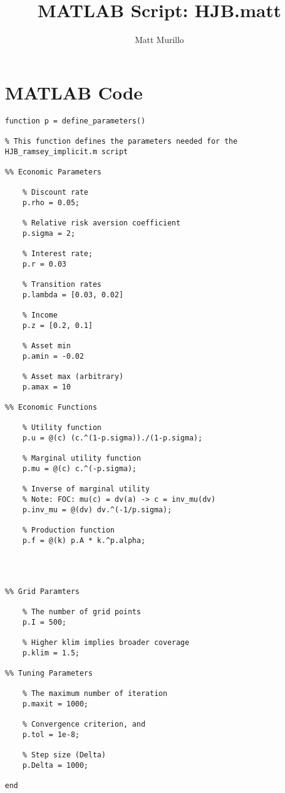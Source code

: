 






\title{MATLAB Script: HJB.matt}
\author{Matt Murillo}
\date{}

\maketitle

\section*{MATLAB Code}
\begin{lstlisting}
function p = define_parameters()

% This function defines the parameters needed for the HJB_ramsey_implicit.m script

%% Economic Parameters

    % Discount rate
    p.rho = 0.05;

    % Relative risk aversion coefficient
    p.sigma = 2;
    
    % Interest rate;
    p.r = 0.03

    % Transition rates
    p.lambda = [0.03, 0.02]

    % Income
    p.z = [0.2, 0.1]

    % Asset min
    p.amin = -0.02

    % Asset max (arbitrary)
    p.amax = 10

%% Economic Functions
    
    % Utility function
    p.u = @(c) (c.^(1-p.sigma))./(1-p.sigma);

    % Marginal utility function
    p.mu = @(c) c.^(-p.sigma);

    % Inverse of marginal utility
    % Note: FOC: mu(c) = dv(a) -> c = inv_mu(dv)
    p.inv_mu = @(dv) dv.^(-1/p.sigma);

    % Production function
    p.f = @(k) p.A * k.^p.alpha;

     
      

%% Grid Paramters

    % The number of grid points
    p.I = 500;

    % Higher klim implies broader coverage
    p.klim = 1.5;

%% Tuning Parameters
    
    % The maximum number of iteration
    p.maxit = 1000;

    % Convergence criterion, and
    p.tol = 1e-8;

    % Step size (Delta)
    p.Delta = 1000;

end
\end{lstlisting}


